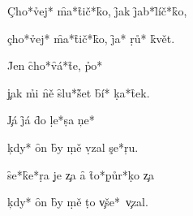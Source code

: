 \c{Cho*}\h{vej*}   \f{ma*}\f{tič*}\f{ko,}
\f{jak}   \f{jab*}\f{líč*}\f{ko,}

\c{cho*}\h{vej*}   \f{ma*}\f{tič*}\f{ko,}
\f{ja*} \d{rů*} \f{květ.}

\f{Jen}    \f{cho*}\f{vá*}\f{te,}
    \h{po*}

\c{jak} \h{mi}  \f{ně} \f{slu*}\f{šet}
\f{bí*} \d{ka*}\f{tek.}



\c{Já}   
\f{já} \f{do} \d{le*}\d{sa} \c{ne*}

\c{kdy*}    
\f{on} \f{by} \d{mě} \d{vzal} \c{se*}\c{ru.}

\f{se*}\f{ke*}\d{ra} \d{je} \c{za}  
\f{a} \f{to*}\d{půr*}\d{ko} \c{za} 

\c{kdy*}    
\f{on} \f{by} \d{mě} \d{to} \c{vše*}~\c{vzal.}

\bye
